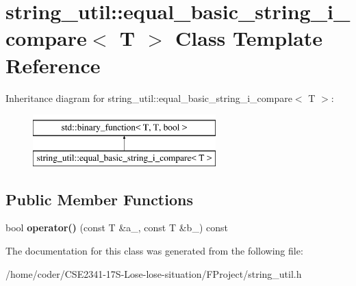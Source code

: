 \section{string\+\_\+util\+:\+:equal\+\_\+basic\+\_\+string\+\_\+i\+\_\+compare$<$ T $>$ Class Template Reference}
\label{classstring__util_1_1equal__basic__string__i__compare}
Inheritance diagram for string\+\_\+util\+:\+:equal\+\_\+basic\+\_\+string\+\_\+i\+\_\+compare$<$ T $>$\+:\begin{figure}[H]
\begin{center}
\leavevmode
\includegraphics[height=2.000000cm]{classstring__util_1_1equal__basic__string__i__compare}
\end{center}
\end{figure}
\subsection*{Public Member Functions}
\begin{DoxyCompactItemize}
\item 
bool {\bfseries operator()} (const T \&a\+\_\+, const T \&b\+\_\+) const \label{classstring__util_1_1equal__basic__string__i__compare_a29fabe519d28908f5b72dcb799cac64f}

\end{DoxyCompactItemize}


The documentation for this class was generated from the following file\+:\begin{DoxyCompactItemize}
\item 
/home/coder/\+C\+S\+E2341-\/17\+S-\/\+Lose-\/lose-\/situation/\+F\+Project/string\+\_\+util.\+h\end{DoxyCompactItemize}
